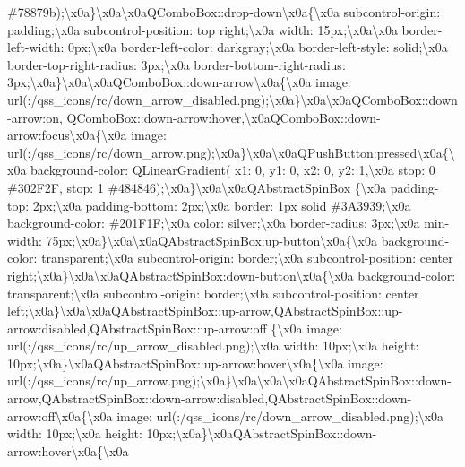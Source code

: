 \#78879b);\textbackslash{}x0a\}\textbackslash{}x0a\textbackslash{}x0a\+Q\+Combo\+Box\+::drop-\/down\textbackslash{}x0a\{\textbackslash{}x0a subcontrol-\/origin\+: padding;\textbackslash{}x0a subcontrol-\/position\+: top right;\textbackslash{}x0a width\+: 15px;\textbackslash{}x0a\textbackslash{}x0a border-\/left-\/width\+: 0px;\textbackslash{}x0a border-\/left-\/color\+: darkgray;\textbackslash{}x0a border-\/left-\/style\+: solid;\textbackslash{}x0a border-\/top-\/right-\/radius\+: 3px;\textbackslash{}x0a border-\/bottom-\/right-\/radius\+: 3px;\textbackslash{}x0a\}\textbackslash{}x0a\textbackslash{}x0a\+Q\+Combo\+Box\+::down-\/arrow\textbackslash{}x0a\{\textbackslash{}x0a image\+: url(\+:/qss\+\_\+icons/rc/down\+\_\+arrow\+\_\+disabled.\+png);\textbackslash{}x0a\}\textbackslash{}x0a\textbackslash{}x0a\+Q\+Combo\+Box\+::down-\/arrow\+:on, Q\+Combo\+Box\+::down-\/arrow\+:hover,\textbackslash{}x0a\+Q\+Combo\+Box\+::down-\/arrow\+:focus\textbackslash{}x0a\{\textbackslash{}x0a image\+: url(\+:/qss\+\_\+icons/rc/down\+\_\+arrow.\+png);\textbackslash{}x0a\}\textbackslash{}x0a\textbackslash{}x0a\+Q\+Push\+Button\+:pressed\textbackslash{}x0a\{\textbackslash{}x0a background-\/color\+: Q\+Linear\+Gradient( x1\+: 0, y1\+: 0, x2\+: 0, y2\+: 1,\textbackslash{}x0a stop\+: 0 \#302\+F2\+F, stop\+: 1 \#484846);\textbackslash{}x0a\}\textbackslash{}x0a\textbackslash{}x0a\+Q\+Abstract\+Spin\+Box \{\textbackslash{}x0a padding-\/top\+: 2px;\textbackslash{}x0a padding-\/bottom\+: 2px;\textbackslash{}x0a border\+: 1px solid \#3\+A3939;\textbackslash{}x0a background-\/color\+: \#201\+F1\+F;\textbackslash{}x0a color\+: silver;\textbackslash{}x0a border-\/radius\+: 3px;\textbackslash{}x0a min-\/width\+: 75px;\textbackslash{}x0a\}\textbackslash{}x0a\textbackslash{}x0a\+Q\+Abstract\+Spin\+Box\+:up-\/button\textbackslash{}x0a\{\textbackslash{}x0a background-\/color\+: transparent;\textbackslash{}x0a subcontrol-\/origin\+: border;\textbackslash{}x0a subcontrol-\/position\+: center right;\textbackslash{}x0a\}\textbackslash{}x0a\textbackslash{}x0a\+Q\+Abstract\+Spin\+Box\+:down-\/button\textbackslash{}x0a\{\textbackslash{}x0a background-\/color\+: transparent;\textbackslash{}x0a subcontrol-\/origin\+: border;\textbackslash{}x0a subcontrol-\/position\+: center left;\textbackslash{}x0a\}\textbackslash{}x0a\textbackslash{}x0a\+Q\+Abstract\+Spin\+Box\+::up-\/arrow,\+Q\+Abstract\+Spin\+Box\+::up-\/arrow\+:disabled,\+Q\+Abstract\+Spin\+Box\+::up-\/arrow\+:off \{\textbackslash{}x0a image\+: url(\+:/qss\+\_\+icons/rc/up\+\_\+arrow\+\_\+disabled.\+png);\textbackslash{}x0a width\+: 10px;\textbackslash{}x0a height\+: 10px;\textbackslash{}x0a\}\textbackslash{}x0a\+Q\+Abstract\+Spin\+Box\+::up-\/arrow\+:hover\textbackslash{}x0a\{\textbackslash{}x0a image\+: url(\+:/qss\+\_\+icons/rc/up\+\_\+arrow.\+png);\textbackslash{}x0a\}\textbackslash{}x0a\textbackslash{}x0a\textbackslash{}x0a\+Q\+Abstract\+Spin\+Box\+::down-\/arrow,\+Q\+Abstract\+Spin\+Box\+::down-\/arrow\+:disabled,\+Q\+Abstract\+Spin\+Box\+::down-\/arrow\+:off\textbackslash{}x0a\{\textbackslash{}x0a image\+: url(\+:/qss\+\_\+icons/rc/down\+\_\+arrow\+\_\+disabled.\+png);\textbackslash{}x0a width\+: 10px;\textbackslash{}x0a height\+: 10px;\textbackslash{}x0a\}\textbackslash{}x0a\+Q\+Abstract\+Spin\+Box\+::down-\/arrow\+:hover\textbackslash{}x0a\{\textbackslash{}x0a 